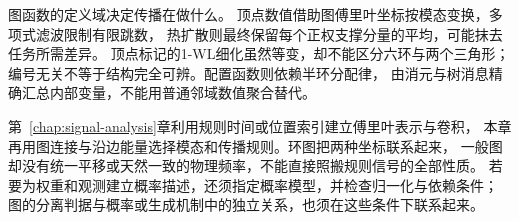 图函数的定义域决定传播在做什么。
顶点数值借助图傅里叶坐标按模态变换，多项式滤波限制有限跳数，
热扩散则最终保留每个正权支撑分量的平均，可能抹去任务所需差异。
顶点标记的1-WL细化虽然等变，却不能区分六环与两个三角形；
编号无关不等于结构完全可辨。配置函数则依赖半环分配律，
由消元与树消息精确汇总内部变量，不能用普通邻域数值聚合替代。

\begin{samepage}
第~\ref{chap:signal-analysis}章利用规则时间或位置索引建立傅里叶表示与卷积，
本章再用图连接与沿边能量选择模态和传播规则。环图把两种坐标联系起来，
一般图却没有统一平移或天然一致的物理频率，不能直接照搬规则信号的全部性质。
若要为权重和观测建立概率描述，还须指定概率模型，并检查归一化与依赖条件；
图的分离判据与概率或生成机制中的独立关系，也须在这些条件下联系起来。

\end{samepage}
